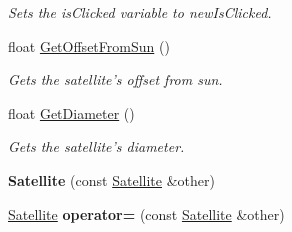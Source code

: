 \begin{DoxyCompactItemize}
\begin{DoxyCompactList}\small\item\em Sets the is\-Clicked variable to new\-Is\-Clicked. \end{DoxyCompactList}\item 
\hypertarget{class_satellite_af93a0103317331a898adf8923a547d7f}{float \hyperlink{class_satellite_af93a0103317331a898adf8923a547d7f}{Get\-Offset\-From\-Sun} ()}\label{class_satellite_af93a0103317331a898adf8923a547d7f}

\begin{DoxyCompactList}\small\item\em Gets the satellite's offset from sun. \end{DoxyCompactList}\item 
\hypertarget{class_satellite_a563b9bb0e55a27bcb7ac9f134408711a}{float \hyperlink{class_satellite_a563b9bb0e55a27bcb7ac9f134408711a}{Get\-Diameter} ()}\label{class_satellite_a563b9bb0e55a27bcb7ac9f134408711a}

\begin{DoxyCompactList}\small\item\em Gets the satellite's diameter. \end{DoxyCompactList}\item 
\hypertarget{class_satellite_a3c1f0d849c8885f0b524a64ea478e2eb}{{\bfseries Satellite} (const \hyperlink{class_satellite}{Satellite} \&other)}\label{class_satellite_a3c1f0d849c8885f0b524a64ea478e2eb}

\item 
\hypertarget{class_satellite_a7fbf21c092b5c43a5cd2db41aa5a78f9}{\hyperlink{class_satellite}{Satellite} {\bfseries operator=} (const \hyperlink{class_satellite}{Satellite} \&other)}\label{class_satellite_a7fbf21c092b5c43a5cd2db41aa5a78f9}

\end{DoxyCompactItemize}
